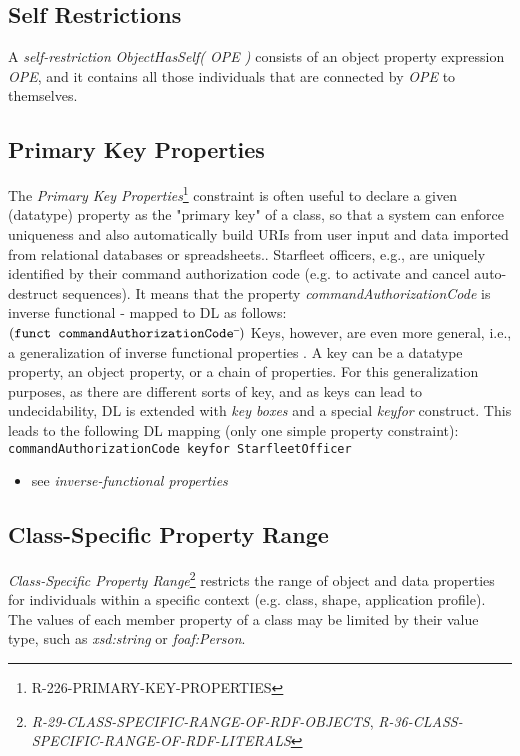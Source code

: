 \documentclass{llncs}
\newcommand{\ms}[1]{\texttt{#1}}
\begin{document}
\subsection{Self Restrictions}

A \emph{self-restriction} \emph{ObjectHasSelf( OPE )} consists of an object property expression \emph{OPE}, and it contains all those individuals that are connected by \emph{OPE} to themselves. 

\subsection{Primary Key Properties}

The \emph{Primary Key Properties}\footnote{R-226-PRIMARY-KEY-PROPERTIES} constraint is often useful to declare a given (datatype) property as the "primary key" of a class, so that a system can enforce uniqueness and also automatically build URIs from user input and data imported from relational databases or spreadsheets.. 
Starfleet officers, e.g., are uniquely identified by their command authorization code (e.g. to activate and cancel auto-destruct sequences).
It means that the property \emph{commandAuthorizationCode} is inverse functional - mapped to DL as follows:
$(\ms{funct commandAuthorizationCode}\sp{\overline{\ }})$
Keys, however, are even more general, i.e., a generalization of inverse functional properties \cite{Schneider2009}.
A key can be a datatype property, an object property, or a chain of properties.
For this generalization purposes, as there are different sorts of key, and as keys can lead to undecidability, 
DL is extended with \emph{key boxes} and a special \emph{keyfor} construct\cite{Lutz2005}.
This leads to the following DL mapping (only one simple property constraint):
\ms{commandAuthorizationCode \ms{keyfor} StarfleetOfficer}

\begin{itemize}
	\item see \emph{inverse-functional properties}
\end{itemize}

\subsection{Class-Specific Property Range}		

{\em Class-Specific Property Range}\footnote{{\em R-29-CLASS-SPECIFIC-RANGE-OF-RDF-OBJECTS}, {\em R-36-CLASS-SPECIFIC-RANGE-OF-RDF-LITERALS}} restricts the range of object and data properties for individuals within a specific context (e.g. class, shape, application profile).
The values of each member property of a class may be limited by their value type, such as \emph{xsd:string} or \emph{foaf:Person}. 
\end{document}
